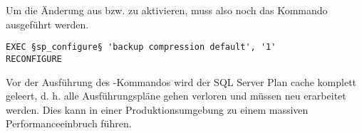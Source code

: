         Um die Änderung aus  bzw. 
        zu aktivieren, muss also noch das Kommando 
        ausgeführt werden.
        \begin{lstlisting}[language=ms_sql,caption={Ein erstes Beispiel zur
          Nutzung von sp\_configure},label=admin03_04]
EXEC §sp_configure§ 'backup compression default', '1'
RECONFIGURE
          \end{lstlisting}
        \begin{merke}
          Vor der Ausführung des -Kommandos wird
          der SQL Server Plan cache komplett geleert, d. h. alle
          Ausführungspläne gehen verloren und müssen neu erarbeitet werden.
          Dies kann in einer Produktionsumgebung zu einem massiven
          Performanceeinbruch führen.
        \end{merke}
